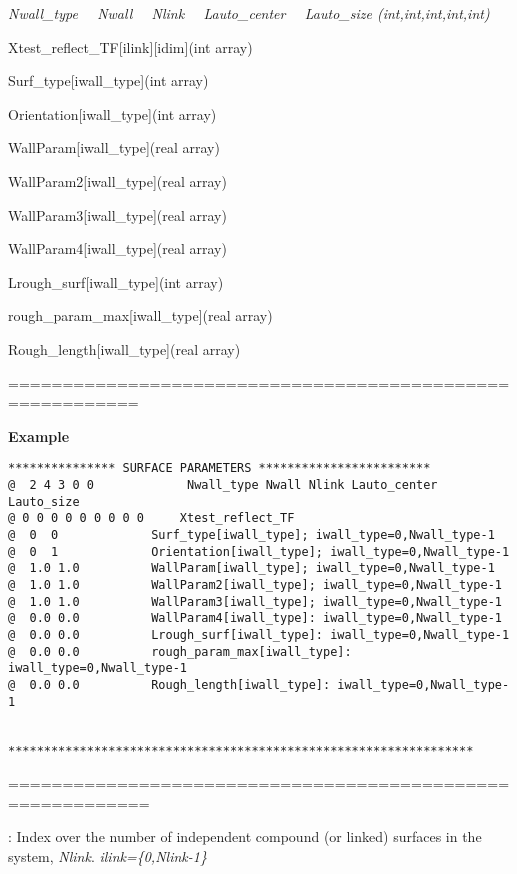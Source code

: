 \documentclass[10pt,onecolumn]{article}
\begin{document}
{\it Nwall\_type \ \ Nwall \ \ Nlink \ \ Lauto\_center \ \ Lauto\_size (int,int,int,int,int)

Xtest\_reflect\_TF[ilink][idim](int array)

Surf\_type[iwall\_type](int array)

Orientation[iwall\_type](int array)

WallParam[iwall\_type](real array)

WallParam2[iwall\_type](real array)

WallParam3[iwall\_type](real array)

WallParam4[iwall\_type](real array)

Lrough\_surf[iwall\_type](int array)

rough\_param\_max[iwall\_type](real array)

Rough\_length[iwall\_type](real array)
}

\noindent==========================================================

{\bf Example}

\begin{verbatim}
*************** SURFACE PARAMETERS ************************
@  2 4 3 0 0             Nwall_type Nwall Nlink Lauto_center Lauto_size
@ 0 0 0 0 0 0 0 0 0     Xtest_reflect_TF
@  0  0             Surf_type[iwall_type]; iwall_type=0,Nwall_type-1
@  0  1             Orientation[iwall_type]; iwall_type=0,Nwall_type-1
@  1.0 1.0          WallParam[iwall_type]; iwall_type=0,Nwall_type-1
@  1.0 1.0          WallParam2[iwall_type]; iwall_type=0,Nwall_type-1
@  1.0 1.0          WallParam3[iwall_type]; iwall_type=0,Nwall_type-1
@  0.0 0.0          WallParam4[iwall_type]: iwall_type=0,Nwall_type-1
@  0.0 0.0          Lrough_surf[iwall_type]: iwall_type=0,Nwall_type-1
@  0.0 0.0          rough_param_max[iwall_type]: iwall_type=0,Nwall_type-1
@  0.0 0.0          Rough_length[iwall_type]: iwall_type=0,Nwall_type-1
  

*****************************************************************
\end{verbatim}

\noindent===========================================================
\vspace{0.1in}


\vspace{0.1in}
:  Index over the number of independent compound (or
linked) surfaces in the system, {\it Nlink}.  {\it
ilink=\{0,Nlink-1\}}
\end{document}
